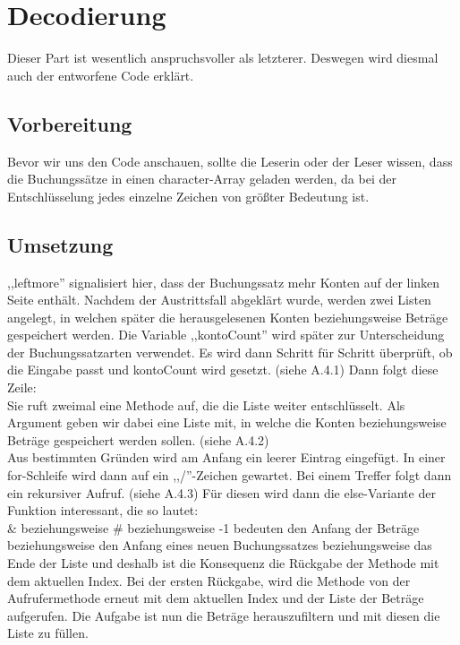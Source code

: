 \documentclass[12pt]{report}
\begin{document}
\chapter{Decodierung}
Dieser Part ist wesentlich anspruchsvoller als letzterer. Deswegen wird diesmal auch der entworfene Code erklärt.

\section{Vorbereitung}
Bevor wir uns den Code anschauen, sollte die Leserin oder der Leser wissen, dass die Buchungssätze in einen character-Array geladen werden, da bei der Entschlüsselung jedes einzelne Zeichen von größter Bedeutung ist.

\section{Umsetzung}



\noindent ,,leftmore'' signalisiert hier, dass der Buchungssatz mehr Konten auf der linken Seite enthält. Nachdem der Austrittsfall abgeklärt wurde, werden zwei Listen angelegt, in welchen später die herausgelesenen Konten beziehungsweise Beträge gespeichert werden. Die Variable ,,kontoCount'' wird später zur Unterscheidung der Buchungssatzarten verwendet. Es wird dann Schritt für Schritt überprüft, ob die Eingabe passt und kontoCount wird gesetzt. (siehe A.4.1)  Dann folgt diese Zeile:\\



\noindent Sie ruft zweimal eine Methode auf, die die Liste weiter entschlüsselt. Als Argument geben wir dabei eine Liste mit, in welche die Konten beziehungsweise Beträge gespeichert werden sollen. (siehe A.4.2)\\


\noindent Aus bestimmten Gründen wird am Anfang ein leerer Eintrag eingefügt. In einer for-Schleife wird dann auf ein ,,/''-Zeichen gewartet. Bei einem Treffer folgt dann ein rekursiver Aufruf. (siehe A.4.3)  Für diesen wird dann die else-Variante der Funktion interessant, die so lautet:\\


\noindent \& beziehungsweise \# beziehungsweise -1 bedeuten den Anfang der Beträge beziehungsweise den Anfang eines neuen Buchungssatzes beziehungsweise das Ende der Liste und deshalb ist die Konsequenz die Rückgabe der Methode mit dem aktuellen Index. Bei der ersten Rückgabe, wird die Methode von der Aufrufermethode erneut mit dem aktuellen Index und der Liste der Beträge aufgerufen. Die Aufgabe ist nun die Beträge herauszufiltern und mit diesen die Liste zu füllen.\\
\end{document}
